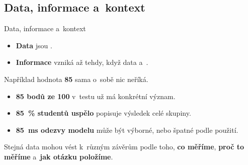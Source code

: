 \documentclass[11pt,professionalfont,aspectratio=43]{beamer}
\begin{document}
\subsection{Data, informace a~kontext}

\begin{frame}{Data, informace a~kontext}
\begin{itemize}
    \item \textbf{Data} jsou .
    \item \textbf{Informace} vzniká až tehdy, když data  a~.
\end{itemize}

\vspace{0.2cm}

\begin{tnoticeframe*}
\begin{center}
    Například hodnota \textbf{85} sama o~sobě nic neříká.
\end{center}
\end{tnoticeframe*}

\vspace{0.1cm}

\begin{itemize}
    \item \textbf{85 bodů ze 100} v~testu už má konkrétní význam.
    \item \textbf{85~\% studentů uspělo} popisuje výsledek celé skupiny.
    \item \textbf{85~ms odezvy modelu} může být výborné, nebo špatné podle použití.
\end{itemize}

\vspace{0.1cm}

\begin{timportantframe}
Stejná data mohou vést k~různým závěrům podle toho,
\textbf{co měříme}, \textbf{proč to měříme} a~\textbf{jak otázku položíme}.
\end{timportantframe}

\end{frame}
\end{document}
